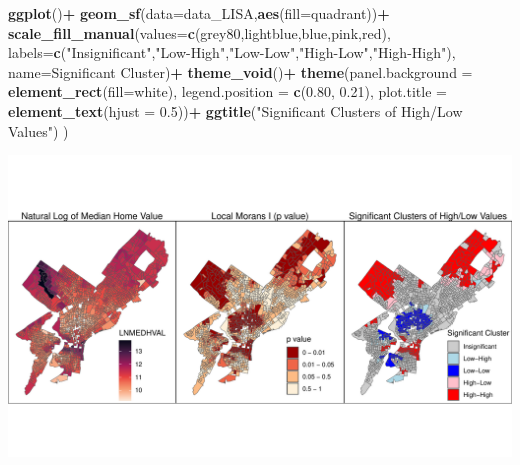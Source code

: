 \documentclass[
]{article}
\newenvironment{Shaded}{\begin{snugshade}}{\end{snugshade}}
\newcommand{\AttributeTok}[1]{\textcolor[rgb]{0.13,0.29,0.53}{#1}}
\newcommand{\FloatTok}[1]{\textcolor[rgb]{0.00,0.00,0.81}{#1}}
\newcommand{\FunctionTok}[1]{\textcolor[rgb]{0.13,0.29,0.53}{\textbf{#1}}}
\newcommand{\NormalTok}[1]{#1}
\newcommand{\SpecialCharTok}[1]{\textcolor[rgb]{0.81,0.36,0.00}{\textbf{#1}}}
\newcommand{\StringTok}[1]{\textcolor[rgb]{0.31,0.60,0.02}{#1}}
\begin{document}
\begin{Shaded}
\begin{Highlighting}[]
\FunctionTok{ggplot}\NormalTok{()}\SpecialCharTok{+}
  \FunctionTok{geom\_sf}\NormalTok{(}\AttributeTok{data=}\NormalTok{data\_LISA,}\FunctionTok{aes}\NormalTok{(}\AttributeTok{fill=}\NormalTok{quadrant))}\SpecialCharTok{+}
  \FunctionTok{scale\_fill\_manual}\NormalTok{(}\AttributeTok{values=}\FunctionTok{c}\NormalTok{(}\StringTok{\textquotesingle{}grey80\textquotesingle{}}\NormalTok{,}\StringTok{\textquotesingle{}lightblue\textquotesingle{}}\NormalTok{,}\StringTok{\textquotesingle{}blue\textquotesingle{}}\NormalTok{,}\StringTok{\textquotesingle{}pink\textquotesingle{}}\NormalTok{,}\StringTok{\textquotesingle{}red\textquotesingle{}}\NormalTok{),}
                    \AttributeTok{labels=}\FunctionTok{c}\NormalTok{(}\StringTok{"Insignificant"}\NormalTok{,}\StringTok{"Low{-}High"}\NormalTok{,}\StringTok{"Low{-}Low"}\NormalTok{,}\StringTok{"High{-}Low"}\NormalTok{,}\StringTok{"High{-}High"}\NormalTok{),}
                    \AttributeTok{name=}\StringTok{\textquotesingle{}Significant Cluster\textquotesingle{}}\NormalTok{)}\SpecialCharTok{+}
  \FunctionTok{theme\_void}\NormalTok{()}\SpecialCharTok{+}
  \FunctionTok{theme}\NormalTok{(}\AttributeTok{panel.background =} \FunctionTok{element\_rect}\NormalTok{(}\AttributeTok{fill=}\StringTok{\textquotesingle{}white\textquotesingle{}}\NormalTok{),}
        \AttributeTok{legend.position =} \FunctionTok{c}\NormalTok{(}\FloatTok{0.80}\NormalTok{, }\FloatTok{0.21}\NormalTok{),}
        \AttributeTok{plot.title =} \FunctionTok{element\_text}\NormalTok{(}\AttributeTok{hjust =} \FloatTok{0.5}\NormalTok{))}\SpecialCharTok{+}
  \FunctionTok{ggtitle}\NormalTok{(}\StringTok{"Significant Clusters of High/Low Values"}\NormalTok{)}
\NormalTok{)}
\end{Highlighting}
\end{Shaded}

\includegraphics{HW2-SpatialRegression_files/figure-latex/Morans_I_map-1.pdf}
\end{document}
